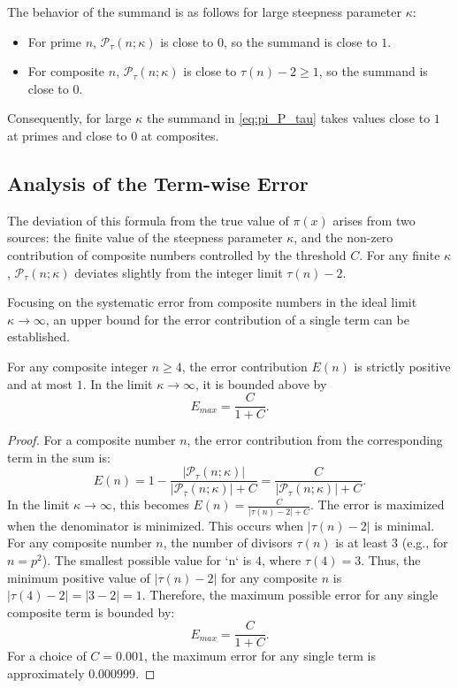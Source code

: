 The behavior of the summand is as follows for large steepness parameter $\kappa$:
\begin{itemize}
    \item For prime $n$, $\mathcal{P}_{\tau}(n; \kappa)$ is close to $0$, so the summand is close to $1$.
    \item For composite $n$, $\mathcal{P}_{\tau}(n; \kappa)$ is close to $\tau(n)-2 \ge 1$, so the summand is close to $0$.
\end{itemize}
Consequently, for large $\kappa$ the summand in \eqref{eq:pi_P_tau} takes values close to $1$ at primes and close to $0$ at composites.

\subsection{Analysis of the Term-wise Error}
The deviation of this formula from the true value of $\pi(x)$ arises from two sources: the finite value of the steepness parameter $\kappa$, and the non-zero contribution of composite numbers controlled by the threshold $C$. For any finite $\kappa$, $\mathcal{P}_{\tau}(n; \kappa)$ deviates slightly from the integer limit $\tau(n)-2$.

Focusing on the systematic error from composite numbers in the ideal limit $\kappa\to\infty$, an upper bound for the error contribution of a single term can be established.

\begin{proposition}
For any composite integer $n \ge 4$, the error contribution $E(n)$ is strictly positive and at most $1$. In the limit $\kappa\to\infty$, it is bounded above by
\[ E_{max} = \frac{C}{1+C}. \]
\end{proposition}

\begin{proof}
For a composite number $n$, the error contribution from the corresponding term in the sum is:
\[ E(n) = 1 - \frac{|\mathcal{P}_{\tau}(n; \kappa)|}{|\mathcal{P}_{\tau}(n; \kappa)| + C} = \frac{C}{|\mathcal{P}_{\tau}(n; \kappa)| + C}. \]
In the limit $\kappa\to\infty$, this becomes $E(n) = \frac{C}{|\tau(n)-2| + C}$.
The error is maximized when the denominator is minimized. This occurs when $|\tau(n)-2|$ is minimal. For any composite number $n$, the number of divisors $\tau(n)$ is at least 3 (e.g., for $n=p^2$). The smallest possible value for `n` is $4$, where $\tau(4)=3$. Thus, the minimum positive value of $|\tau(n)-2|$ for any composite $n$ is $|\tau(4)-2| = |3-2|=1$.
Therefore, the maximum possible error for any single composite term is bounded by:
\[ E_{max} = \frac{C}{1+C}. \]
For a choice of $C=0.001$, the maximum error for any single term is approximately $0.000999$.
\end{proof}

